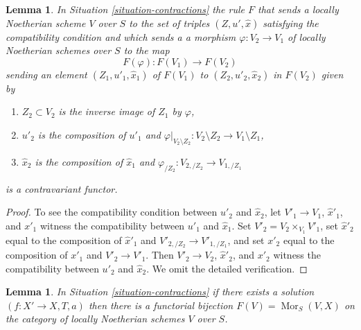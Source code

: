 \documentclass{stacks-project}
\theoremstyle{plain}
\newtheorem{lemma}[subsection]{Lemma}
\theoremstyle{definition}
\theoremstyle{remark}
\numberwithin{equation}{subsection}
\def\Mor{\mathop{\mathrm{Mor}}\nolimits}
\begin{document}
\begin{lemma}
\label{lemma-functor}
In Situation \ref{situation-contractions} the rule $F$ that sends
a locally Noetherian scheme $V$ over $S$ to the set of triples
$(Z, u', \hat x)$ satisfying the compatibility condition and which sends a
a morphism $\varphi : V_2 \to V_1$ of locally Noetherian schemes over $S$
to the map
$$
F(\varphi) : F(V_1) \longrightarrow F(V_2)
$$
sending an element $(Z_1, u'_1, \hat x_1)$ of $F(V_1)$ to
$(Z_2, u'_2, \hat x_2)$ in $F(V_2)$ given by
\begin{enumerate}
\item $Z_2 \subset V_2$ is the inverse image of $Z_1$ by $\varphi$,
\item $u'_2$ is the composition of $u'_1$ and
$\varphi|_{V_2 \setminus Z_2} : V_2 \setminus Z_2 \to V_1 \setminus Z_1$,
\item $\hat x_2$ is the composition of $\hat x_1$ and
$\varphi_{/Z_2} : V_{2, /Z_2} \to V_{1, /Z_1}$
\end{enumerate}
is a contravariant functor.
\end{lemma}

\begin{proof}
To see the compatibility condition between $u'_2$ and $\hat x_2$, let
$V'_1 \to V_1$, $\hat x'_1$, and $x'_1$ witness the compatibility between
$u'_1$ and $\hat x_1$. Set $V'_2 = V_2 \times_{V_1} V'_1$, set
$\hat x'_2$ equal to the composition of $\hat x'_1$ and
$V'_{2, /Z_2} \to V'_{1, /Z_1}$, and set $x'_2$
equal to the composition of $x'_1$ and $V'_2 \to V'_1$.
Then $V'_2 \to V_2$, $\hat x'_2$, and $x'_2$ witness the compatibility between
$u'_2$ and $\hat x_2$. We omit the detailed verification.
\end{proof}

\begin{lemma}
\label{lemma-solution}
In Situation \ref{situation-contractions} if there exists a solution
$(f : X' \to X, T, a)$ then there is a functorial bijection
$F(V) = \Mor_S(V, X)$ on the category of
locally Noetherian schemes $V$ over $S$.
\end{lemma}
\end{document}
